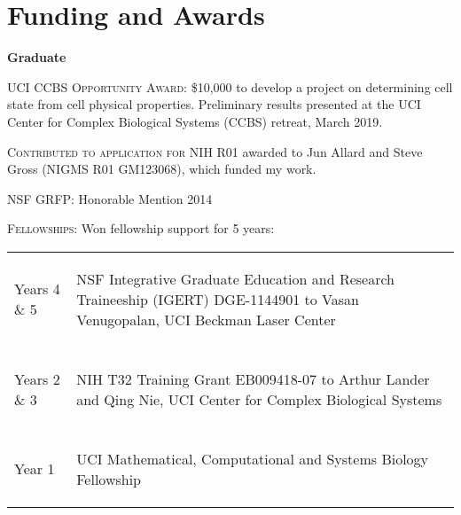 \documentclass[letterpaper,10pt]{article} %
\makeatletter
\newcommand\cellwidth{\TX@col@width}
\makeatother
\begin{document}
\bigskip
\section*{Funding and Awards}
\bigskip

{\large \textbf{Graduate}}

\begin{description}[itemsep=-1ex]
\item \textsc{UCI CCBS Opportunity Award}: \$10,000 to develop a project on determining cell state from cell physical properties. Preliminary results presented at the UCI Center for Complex Biological Systems (CCBS) retreat, March 2019.
\item \textsc{Contributed to application for NIH R01} awarded to Jun Allard and Steve Gross (NIGMS R01 GM123068), which funded my work.
\item \textsc{NSF GRFP}: Honorable Mention 2014
\item \textsc{Fellowships}: Won fellowship support for 5 years:
\end{description}

\begin{tabularx}{\textwidth}{>{\raggedleft}p{} | X}

Years 4 \& 5 &
\begin{minipage}{\cellwidth}
\begin{description}[itemsep=.25ex,labelsep=0em]
\item NSF Integrative Graduate Education and Research Traineeship (IGERT) DGE-1144901 to Vasan Venugopalan, UCI Beckman Laser Center
\end{description}
\end{minipage} \\

\multicolumn{2}{c}{} \\

Years 2 \& 3 &
\begin{minipage}{\cellwidth}
\begin{description}[itemsep=.25ex,labelsep=0em]
\item NIH T32 Training Grant EB009418-07 to Arthur Lander and Qing Nie, UCI Center for Complex Biological Systems
\end{description}
\end{minipage} \\

\multicolumn{2}{c}{} \\

Year 1 &
\begin{minipage}{\cellwidth}
\begin{description}[itemsep=.25ex,labelsep=0em]
\item UCI Mathematical, Computational and Systems Biology Fellowship
\end{description}
\end{minipage}
\end{tabularx}
 
\end{document}
